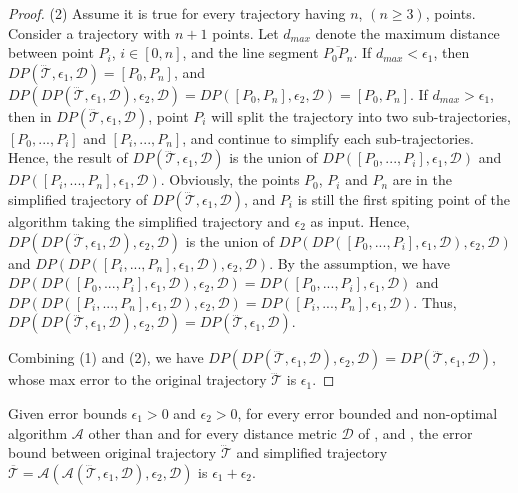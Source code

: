 \begin{proof}
	(2) Assume it is true for every trajectory  having $n$, $(n \ge 3)$, points.
	Consider a trajectory with $n+1$ points. Let $d_{max}$ denote the maximum distance between point $P_i$, $i \in [0,n]$, and the line segment $\overline{P_0P_{n}}$. 
	If $d_{max}<\epsilon_1$, then $DP(\dddot{\mathcal{T}}, \epsilon_1, \mathcal{D})=[P_0, P_{n}]$, and $DP(DP(\dddot{\mathcal{T}}, \epsilon_1, \mathcal{D}), \epsilon_2, \mathcal{D}) = DP([P_0, P_{n}], \epsilon_2, \mathcal{D})=[P_0, P_{n}]$.
	If $d_{max} > \epsilon_1$, then in $DP(\dddot{\mathcal{T}}, \epsilon_1, \mathcal{D})$, point $P_i$ will split the trajectory  into two sub-trajectories, \ie $[P_0, ..., P_i]$ and $[P_{i}, ..., P_{n}]$, and continue to simplify each sub-trajectories. Hence, the result of $DP(\dddot{\mathcal{T}}, \epsilon_1, \mathcal{D})$ is the union of $DP([P_0, ..., P_i], \epsilon_1, \mathcal{D})$ and $DP([P_i, ..., P_n], \epsilon_1, \mathcal{D})$.
	Obviously, the points $P_0$, $P_i$ and $P_n$ are in the simplified trajectory of $DP(\dddot{\mathcal{T}}, \epsilon_1, \mathcal{D})$, and $P_i$ is still the first spiting point of the \dpa algorithm taking the simplified trajectory and $\epsilon_2$ as input. Hence, $DP(DP(\dddot{\mathcal{T}}, \epsilon_1, \mathcal{D}), \epsilon_2, \mathcal{D})$ is the union of $DP(DP([P_0, ..., P_i], \epsilon_1, \mathcal{D}), \epsilon_2, \mathcal{D})$ and $DP(DP([P_i, ..., P_n], \epsilon_1, \mathcal{D}), \epsilon_2, \mathcal{D})$. By the assumption, we have $DP(DP([P_0, ..., P_i], \epsilon_1, \mathcal{D}), \epsilon_2, \mathcal{D}) = DP([P_0, ..., P_i], \epsilon_1, \mathcal{D})$ and $DP(DP([P_i, ..., P_n], \epsilon_1, \mathcal{D}), \epsilon_2, \mathcal{D}) = DP([P_i, ..., P_n], \epsilon_1, \mathcal{D})$. Thus, $DP(DP(\dddot{\mathcal{T}}, \epsilon_1, \mathcal{D}), \epsilon_2, \mathcal{D}) = DP(\dddot{\mathcal{T}}, \epsilon_1, \mathcal{D})$.
	
	Combining (1) and (2), we have $DP(DP(\dddot{\mathcal{T}}, \epsilon_1, \mathcal{D}), \epsilon_2, \mathcal{D}) = DP(\dddot{\mathcal{T}}, \epsilon_1, \mathcal{D})$, whose max error to the original trajectory $\dddot{\mathcal{T}}$ is $\epsilon_1$.
\end{proof}




\begin{theorem}
	\label{theo-aging-distance}
	Given error bounds $\epsilon_1>0$ and $\epsilon_2>0$, for every error bounded and non-optimal \lsa algorithm $\mathcal{A}$ other than \dpa and for every distance metric $\mathcal{D}$ of \ped, \sed and \dad, the error bound between original trajectory $\dddot{\mathcal{T}}$ and simplified trajectory $\overline{\mathcal{T}}=\mathcal{A}(\mathcal{A}(\dddot{\mathcal{T}}, \epsilon_1, \mathcal{D}), \epsilon_2, \mathcal{D})$ is $\epsilon_1+ \epsilon_2$.
\end{theorem}

